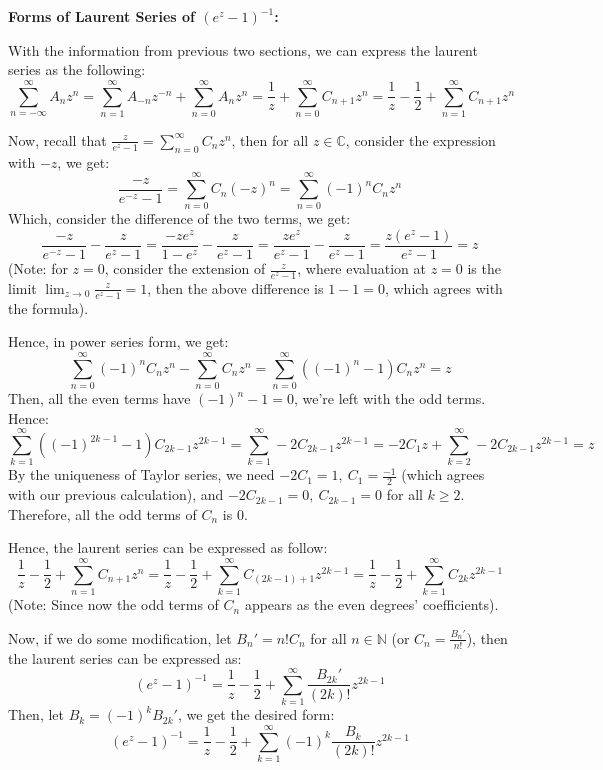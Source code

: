 \documentclass{article}
\begin{document}
\hfil

\textbf{Forms of Laurent Series of $(e^z-1)^{-1}$:}

With the information from previous two sections, we can express the laurent series as the following:
$$\sum_{n=-\infty}^{\infty}A_nz^n = \sum_{n=1}^{\infty}A_{-n}z^{-n}+\sum_{n=0}^{\infty}A_nz^n = \frac{1}{z}+\sum_{n=0}^{\infty}C_{n+1}z^n = \frac{1}{z}-\frac{1}{2}+\sum_{n=1}^{\infty}C_{n+1}z^n$$

Now, recall that $\frac{z}{e^z-1}=\sum_{n=0}^{\infty}C_nz^n$, then for all $z\in\mathbb{C}$, consider the expression with $-z$, we get:
$$\frac{-z}{e^{-z}-1}=\sum_{n=0}^{\infty}C_n(-z)^n = \sum_{n=0}^{\infty}(-1)^nC_nz^n$$
Which, consider the difference of the two terms, we get:
$$\frac{-z}{e^{-z}-1}-\frac{z}{e^z-1} = \frac{-ze^z}{1-e^z}-\frac{z}{e^z-1}=\frac{ze^z}{e^z-1}-\frac{z}{e^z-1}=\frac{z(e^z-1)}{e^z-1}=z$$
(Note: for $z=0$, consider the extension of $\frac{z}{e^z-1}$, where evaluation at $z=0$ is the limit $\lim_{z\rightarrow 0}\frac{z}{e^z-1}=1$, then the above difference is $1-1=0$, which agrees with the formula).

Hence, in power series form, we get:
$$\sum_{n=0}^{\infty}(-1)^nC_nz^n-\sum_{n=0}^{\infty}C_nz^n = \sum_{n=0}^{\infty}((-1)^n-1)C_nz^n=z$$
Then, all the even terms have $(-1)^n-1=0$, we're left with the odd terms. Hence:
$$\sum_{k=1}^{\infty}((-1)^{2k-1}-1)C_{2k-1}z^{2k-1}=\sum_{k=1}^{\infty}-2C_{2k-1}z^{2k-1}=-2C_1z+\sum_{k=2}^{\infty}-2C_{2k-1}z^{2k-1}=z$$
By the uniqueness of Taylor series, we need $-2C_1=1,\ C_1=\frac{-1}{2}$ (which agrees with our previous calculation), and $-2C_{2k-1}=0,\ C_{2k-1}=0$ for all $k\geq 2$.
Therefore, all the odd terms of $C_n$ is $0$.

Hence, the laurent series can be expressed as follow:
$$\frac{1}{z}-\frac{1}{2}+\sum_{n=1}^{\infty}C_{n+1}z^n=\frac{1}{z}-\frac{1}{2}+\sum_{k=1}^{\infty}C_{(2k-1)+1}z^{2k-1}=\frac{1}{z}-\frac{1}{2}+\sum_{k=1}^{\infty}C_{2k}z^{2k-1}$$
(Note: Since now the odd terms of $C_n$ appears as the even degrees' coefficients).

Now, if we do some modification, let $B_n' = n!C_n$ for all $n\in\mathbb{N}$ (or $C_n = \frac{B_n'}{n!}$), then the laurent series can be expressed as:
$$(e^z-1)^{-1}=\frac{1}{z}-\frac{1}{2}+\sum_{k=1}^{\infty}\frac{B_{2k}'}{(2k)!}z^{2k-1}$$
Then, let $B_k=(-1)^kB_{2k}'$, we get the desired form:
$$(e^z-1)^{-1}=\frac{1}{z}-\frac{1}{2}+\sum_{k=1}^{\infty}(-1)^k\frac{B_k}{(2k)!}z^{2k-1}$$

\hfil
\end{document}

